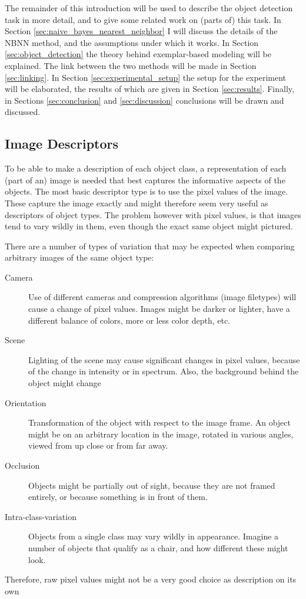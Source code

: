 \documentclass[a4paper,10pt]{article}
\begin{document}
The remainder of this introduction will be used to describe the object detection task in more detail, and to give some related work on (parts of) this task. In Section \ref{sec:naive_bayes_nearest_neighbor} I will discuss the details of the NBNN method, and the assumptions under which it works. In Section \ref{sec:object_detection} the theory behind exemplar-based modeling will be explained. The link between the two methods will be made in Section \ref{sec:linking}. In Section \ref{sec:experimental_setup} the setup for the experiment will be elaborated, the results of which are given in Section \ref{sec:results}. Finally, in Sections \ref{sec:conclusion} and \ref{sec:discussion} conclusions will be drawn and discussed.

\subsection{Image Descriptors} %
\label{sub:image_descriptors}
To be able to make a description of each object class, a representation of each (part of an) image is needed that best captures the informative aspects of the objects. The most basic descriptor type is to use the pixel values of the image. These capture the image exactly and might therefore seem very useful as descriptors of object types. The problem however with pixel values, is that images tend to vary wildly in them, even though the exact same object might pictured.

There are a number of types of variation that may be expected when comparing arbitrary images of the same object type:
\begin{description}
    \item[Camera] Use of different cameras and compression algorithms (image filetypes) will cause a change of pixel values. Images might be darker or lighter, have a different balance of colors, more or less color depth, etc.
    \item[Scene] Lighting of the scene may cause significant changes in pixel values, because of the change in intensity or in spectrum. Also, the background behind the object might change
    \item[Orientation] Transformation of the object with respect to the image frame. An object might be on an arbitrary location in the image, rotated in various angles, viewed from up close or from far away.
    \item[Occlusion] Objects might be partially out of sight, because they are not framed entirely, or because something is in front of them.
    \item[Intra-class-variation] Objects from a single class may vary wildly in appearance. Imagine a number of objects that qualify as a chair, and how different these might look.
\end{description}
Therefore, raw pixel values might not be a very good choice as description on its own
\end{document}

